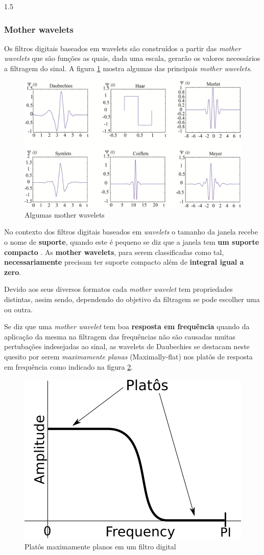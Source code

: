 \documentclass[a4paper,12pt,openright,oneside]{book}
\newenvironment{myenv}[1]
  {\begin{spacing}{#1}}
  {\end{spacing}}
\begin{document}
\begin{myenv}{1.5}
					\subsubsection{Mother wavelets}
					Os filtros digitais baseados em wavelets são construídos a partir das \textit{mother wavelets} que são funções as quais, dada uma escala, gerarão os valores necessários a filtragem do sinal. A figura \ref{fig:wavelets} mostra algumas das principais \textit{mother wavelets}.
					\begin{figure}[h]
						\centering
						\includegraphics[width=0.7\linewidth]{images/wavelets}
						\caption{Algumas mother wavelets}
						\label{fig:wavelets}
					\end{figure}
					
					No contexto dos filtros digitais baseados em \textit{wavelets} o tamanho da janela recebe o nome de \textbf{suporte}, quando este é pequeno se diz que a janela tem \textbf{um suporte compacto} \cite{robi2003}. As \textbf{mother wavelets}, para serem classificadas como tal, \textbf{necessariamente} precisam ter suporte compacto além de \textbf{integral igual a zero}.
				
					\par Devido aos seus diversos formatos cada \textit{mother wavelet} tem propriedades distintas, assim sendo, dependendo do objetivo da filtragem se pode escolher uma ou outra.
					
					\par Se diz que uma \textit{mother wavelet} tem boa \textbf{resposta em frequência} quando da aplicação da mesma na filtragem das frequências não são causadas muitas pertubações indesejadas ao sinal, as wavelets de Daubechies se destacam neste quesito por serem \textit{maximamente planas} (Maximally-flat) nos platôs de resposta em frequência como indicado na figura \ref{fig:daubechies}.

					\begin{figure}[h]
						\centering
						\includegraphics[width=0.3\linewidth]{images/daubechies}
						\caption{Platôs maximamente planos em um filtro digital}
						\label{fig:daubechies}
					\end{figure}


\end{myenv}
\end{document}
